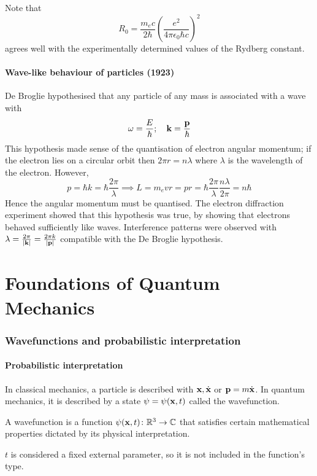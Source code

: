 \documentclass[a4paper,11pt]{article}
\begin{document}
Note that 
\[
R_0=\frac{m_e c}{2 \hbar}\left(\frac{e^2}{4 \pi \epsilon_0 \hbar c}\right)^2
\]
agrees well with the experimentally determined values of the Rydberg constant.

\subsection{Wave-like behaviour of particles (1923)}
De Broglie hypothesised that any particle of any mass is associated with a wave with
\[
	\omega = \frac{E}{\hbar}; \quad \vb k = \frac{\vb p}{\hbar}
\]
This hypothesis made sense of the quantisation of electron angular momentum; if the electron lies on a circular orbit then \( 2 \pi r = n \lambda \) where \( \lambda \) is the wavelength of the electron.
However,
\[
	p = \hbar k = \hbar \frac{2 \pi}{\lambda} \implies L = m_e v r = p r = \hbar \frac{2 \pi}{\lambda} \frac{n \lambda}{2 \pi} = n \hbar
\]
Hence the angular momentum must be quantised.
The electron diffraction experiment showed that this hypothesis was true, by showing that electrons behaved sufficiently like waves.
Interference patterns were observed with \( \lambda = \frac{2 \pi}{\abs{\vb k}} = \frac{2 \pi k}{\abs{\vb p}} \) compatible with the De Broglie hypothesis.

\clearpage

\part{Foundations of Quantum Mechanics}
\section{Wavefunctions and probabilistic interpretation}
\subsection{Probabilistic interpretation}

In classical mechanics, a particle is described with \( \vb x, \dot{\vb x} \) or \( \vb p = m \dot{\vb x} \).
In quantum mechanics, it is described by a state \( \psi= \psi(\vb x, t) \) called the wavefunction.

\begin{definition}
    A wavefunction is a function \( \psi(\vb x, t) \colon \mathbb R^3 \to \mathbb C \) that satisfies certain mathematical properties dictated by its physical interpretation.
\end{definition}
\begin{note}
    \( t \) is considered a fixed external parameter, so it is not included in the function's type.
\end{note}
\end{document}
